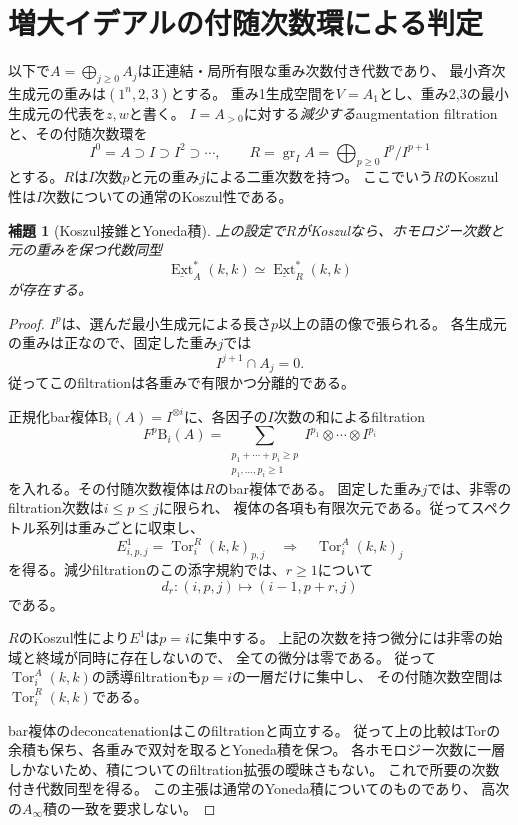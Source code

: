 \documentclass[11pt,a4paper]{ltjsarticle}
\newtheorem{lemma}[theorem]{補題}
\theoremstyle{definition}
\begin{document}
\section{増大イデアルの付随次数環による判定}\label{sec:tangent-ore}

以下で$A=\bigoplus_{j\ge0}A_j$は正連結・局所有限な重み次数付き代数であり、
最小斉次生成元の重みは$(1^n,2,3)$とする。
重み1生成空間を$V=A_1$とし、重み2,3の最小生成元の代表を$z,w$と書く。
$I=A_{>0}$に対する\emph{減少する}augmentation filtrationと、その付随次数環を
\[
 I^0=A\supset I\supset I^2\supset\cdots,
 \qquad R=\operatorname{gr}_I A=\bigoplus_{p\ge0}I^p/I^{p+1}
\]
とする。$R$は$I$次数$p$と元の重み$j$による二重次数を持つ。
ここでいう$R$のKoszul性は$I$次数についての通常のKoszul性である。

\begin{lemma}[Koszul接錐とYoneda積]
\label{iadic:lem:ext-comparison}
上の設定で$R$がKoszulなら、ホモロジー次数と元の重みを保つ代数同型
\[
 \underline{\operatorname{Ext}}_A^*(k,k)
 \simeq \underline{\operatorname{Ext}}_R^*(k,k)
\]
が存在する。
\end{lemma}
\begin{proof}
$I^p$は、選んだ最小生成元による長さ$p$以上の語の像で張られる。
各生成元の重みは正なので、固定した重み$j$では
\[
 I^{j+1}\cap A_j=0.
\]
従ってこのfiltrationは各重みで有限かつ分離的である。

正規化bar複体$\mathrm B_i(A)=I^{\otimes i}$に、各因子の$I$次数の和によるfiltration
\[
 F^p\mathrm B_i(A)=
 \sum_{\substack{p_1+\cdots+p_i\ge p\\p_1,\ldots,p_i\ge1}}
 I^{p_1}\otimes\cdots\otimes I^{p_i}
\]
を入れる。その付随次数複体は$R$のbar複体である。
固定した重み$j$では、非零のfiltration次数は$i\le p\le j$に限られ、
複体の各項も有限次元である。従ってスペクトル系列は重みごとに収束し、
\[
 E^1_{i,p,j}=\operatorname{Tor}^R_i(k,k)_{p,j}
 \quad\Longrightarrow\quad
 \operatorname{Tor}^A_i(k,k)_j
\]
を得る。減少filtrationのこの添字規約では、$r\ge1$について
\[
 d_r:(i,p,j)\longmapsto(i-1,p+r,j)
\]
である。

$R$のKoszul性により$E^1$は$p=i$に集中する。
上記の次数を持つ微分には非零の始域と終域が同時に存在しないので、
全ての微分は零である。
従って$\operatorname{Tor}^A_i(k,k)$の誘導filtrationも$p=i$の一層だけに集中し、
その付随次数空間は$\operatorname{Tor}^R_i(k,k)$である。

bar複体のdeconcatenationはこのfiltrationと両立する。
従って上の比較はTorの余積も保ち、各重みで双対を取るとYoneda積を保つ。
各ホモロジー次数に一層しかないため、積についてのfiltration拡張の曖昧さもない。
これで所要の次数付き代数同型を得る。
この主張は通常のYoneda積についてのものであり、
高次の$A_\infty$積の一致を要求しない。
\end{proof}
\end{document}
